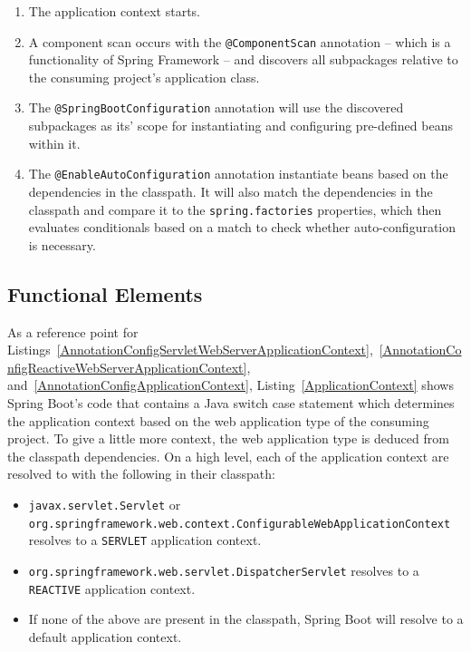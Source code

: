 \begin{enumerate}
\item The application context starts.
\item A component scan occurs with the \texttt{@ComponentScan} annotation -- which is a functionality of Spring Framework -- and discovers all subpackages relative to the consuming project's application class.
\item The \texttt{@SpringBootConfiguration} annotation will use the discovered subpackages as its' scope for instantiating and configuring pre-defined beans within it.
\item The \texttt{@EnableAutoConfiguration} annotation instantiate beans based on the dependencies in the classpath. It will also match the dependencies in the classpath and compare it to the \texttt{spring.factories} properties, which then evaluates conditionals based on a match to check whether auto-configuration is necessary.
\end{enumerate}

\subsection{Functional Elements}

As a reference point for Listings~\ref{AnnotationConfigServletWebServerApplicationContext},~\ref{AnnotationConfigReactiveWebServerApplicationContext}, and~\ref{AnnotationConfigApplicationContext}, Listing~\ref{ApplicationContext} shows Spring Boot's code that contains a Java switch case statement which determines the application context based on the web application type of the consuming project. To give a little more context, the web application type is deduced from the classpath dependencies. On a high level, each of the application context are resolved to with the following in their classpath:

\begin{itemize}
\item \texttt{javax.servlet.Servlet} or\\\texttt{org.springframework.web.context.ConfigurableWebApplicationContext} resolves to a \texttt{SERVLET} application context.
\item \texttt{org.springframework.web.servlet.DispatcherServlet} resolves to a \texttt{REACTIVE} application context.
\item If none of the above are present in the classpath, Spring Boot will resolve to a default application context.
\end{itemize}


